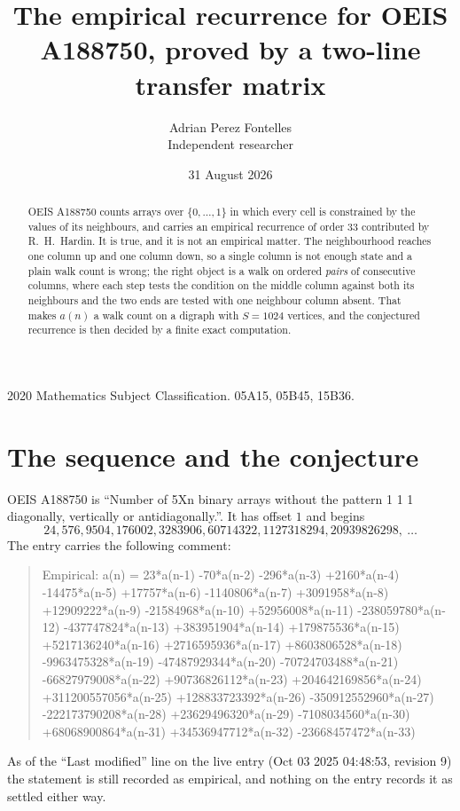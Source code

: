 \documentclass[11pt,a4paper]{article}
\title{The empirical recurrence for OEIS A188750, proved by a two-line transfer matrix}
\author{Adrian Perez Fontelles\\ \small Independent researcher}
\date{31 August 2026}
\theoremstyle{plain}
\theoremstyle{definition}
\begin{document}
\maketitle

\begin{abstract}
OEIS A188750 counts arrays over $\{0,\dots,1\}$ in which every cell is constrained by the
values of its neighbours, and carries an empirical recurrence of order $33$ contributed
by R.~H.~Hardin. It is true, and it is not an empirical matter. The neighbourhood reaches one
column up and one column down, so a single column is not enough state and a plain walk count
is wrong; the right object is a walk on ordered \emph{pairs} of consecutive columns, where
each step tests the condition on the middle column against both its neighbours and the two
ends are tested with one neighbour column absent. That makes $a(n)$ a walk count on a digraph
with $S=1024$ vertices, and the conjectured recurrence is then decided by a finite exact
computation.
\end{abstract}

\noindent\small 2020 Mathematics Subject Classification. 05A15, 05B45, 15B36.\normalsize

\section{The sequence and the conjecture}

OEIS A188750 is ``Number of 5Xn binary arrays without the pattern 1 1 1 diagonally, vertically or antidiagonally.''. It has offset $1$ and begins
\[
24, 576, 9504, 176002, 3283906, 60714322, 1127318294, 20939826298,\ \dots
\]
The entry carries the following comment:
\begin{quote}\small
Empirical: a(n) = 23*a(n-1) -70*a(n-2) -296*a(n-3) +2160*a(n-4) -14475*a(n-5) +17757*a(n-6) -1140806*a(n-7) +3091958*a(n-8) +12909222*a(n-9) -21584968*a(n-10) +52956008*a(n-11) -238059780*a(n-12) -437747824*a(n-13) +383951904*a(n-14) +179875536*a(n-15) +5217136240*a(n-16) +2716595936*a(n-17) +8603806528*a(n-18) -9963475328*a(n-19) -47487929344*a(n-20) -70724703488*a(n-21) -66827979008*a(n-22) +90736826112*a(n-23) +204642169856*a(n-24) +311200557056*a(n-25) +128833723392*a(n-26) -350912552960*a(n-27) -222173790208*a(n-28) +23629496320*a(n-29) -7108034560*a(n-30) +68068900864*a(n-31) +34536947712*a(n-32) -23668457472*a(n-33)
\end{quote}
As of the ``Last modified'' line on the live entry (Oct 03 2025 04:48:53, revision 9) the statement is
still recorded as empirical, and nothing on the entry records it as settled either way.
\end{document}
